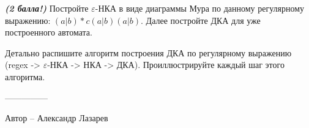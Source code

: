 \question
\textbf{\textit{(2 балла!)}} Постройте $\varepsilon$-НКА в виде диаграммы Мура по данному регулярному выражению: $(a|b)*c(a|b)(a|b)$. Далее постройте ДКА для уже построенного автомата. 

Детально распишите алгоритм построения ДКА по регулярному выражению (regex -> $\varepsilon$-НКА -> НКА -> ДКА). Проиллюстрируйте каждый шаг этого алгоритма. 

---------------

Автор -- Александр Лазарев
